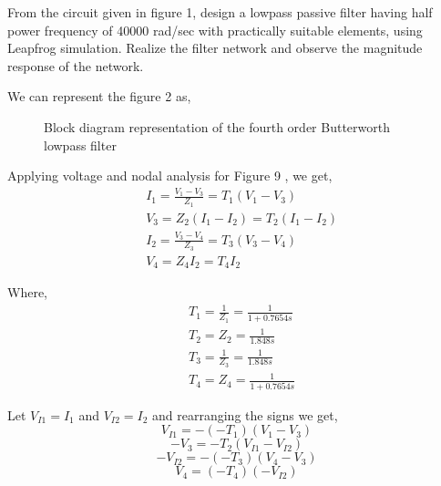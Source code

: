 \documentclass[a4paper,11pt]{article}
\begin{document}
\pagebreak


\begin{Q}
    {From the circuit given in figure 1, design a lowpass passive filter having half power frequency of
        40000 rad/sec with practically suitable elements, using Leapfrog simulation. Realize the filter
        network and observe the magnitude response of the network.}
\end{Q}


We can represent the figure 2 as,
\begin{figure}[H]
    \centering
    \scalebox{1.5}
    \figleap
    \caption{Block diagram representation of the fourth order Butterworth lowpass filter}
\end{figure}

Applying voltage and nodal analysis for Figure 9 , we get,
\begin{equation*}
    \begin{aligned}
         & I_1=\frac{V_1-V_3}{Z_1}=T_1(V_1-V_3)  \\
         & V_3=Z_2(I_1-I_2)=T_2(I_1-I_2)         \\
         & I_2=\frac{V_3-V_4}{Z_3}= T_3(V_3-V_4) \\
         & V_4=Z_4I_2=T_4I_2
    \end{aligned}
\end{equation*}


Where,
\begin{equation*}
    \begin{aligned}
         & T_1=\frac{1}{Z_1}=\frac{1}{1+0.7654s} \\
         & T_2=Z_2=\frac{1}{1.848s}              \\
         & T_3=\frac{1}{Z_3}=\frac{1}{1.848s}    \\
         & T_4=Z_4=\frac{1}{1+0.7654s}
    \end{aligned}
\end{equation*}

Let $V_{I1}=I_1$ and $V_{I2}=I_2$ and rearranging the signs we get,
\begin{equation}
    V_{I1}=-(-T_1)(V_1-V_3)
\end{equation}
\begin{equation}
    -V_3=-T_2(V_{I1}-V_{I2})
\end{equation}
\begin{equation}
    -V_{I2}=-(-T_3)(V_4-V_3)
\end{equation}
\begin{equation}
    V_4=(-T_4)(-V_{I2})
\end{equation}
\end{document}
